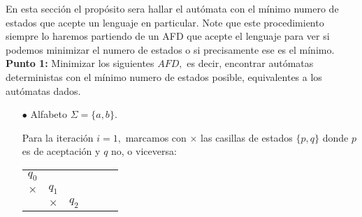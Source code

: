 
En esta sección el propósito sera hallar el autómata con el mínimo numero de estados que acepte un lenguaje en particular. Note que este procedimiento siempre lo haremos partiendo de un AFD que acepte el lenguaje para ver si podemos minimizar el numero de estados o si precisamente ese es el mínimo.\\

\textbf{Punto 1: }Minimizar los siguientes $AFD,$ es decir, encontrar autómatas deterministas con el mínimo numero de estados posible, equivalentes a los autómatas dados.
\begin{itemize}
    \item[$\bullet$] Alfabeto $\Sigma=\{a,b\}.$
        \begin{center}
            \end{center} 
    Para la iteración $i=1,$ marcamos con $\times$ las casillas de estados $\{p,q\}$  donde $p$ es de aceptación y $q$ no, o viceversa:
    \begin{center}
        \begin{tabular}{ cccccc}
        $q_0$& & & & & \\ \cline{1-1}
        \multicolumn{1}{|c|}{$\times$} &$q_1$ & & & & \\ \cline{1-2}
        \multicolumn{1}{|c|}{} &\multicolumn{1}{|c|}{$\times$} &$q_2$ & & & \\ \cline{1-3}

\end{tabular}
\end{center}
\end{itemize}
